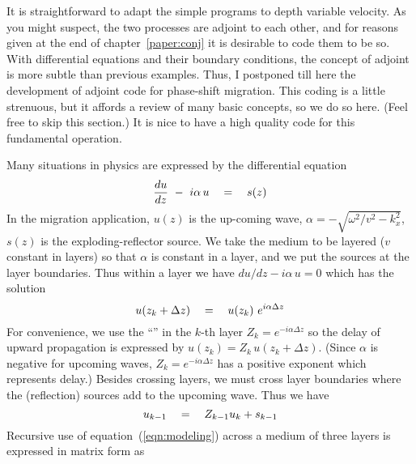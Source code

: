It is straightforward to adapt the simple programs
to depth variable velocity.
As you might suspect, the two processes are adjoint to each other,
and for reasons given at the end of chapter~\ref{paper:conj}
it is desirable to code them to be so.
With differential equations and their boundary conditions,
the concept of adjoint is more subtle than previous examples.
Thus, I postponed till here the development of adjoint code
for phase-shift migration.
This coding is a little strenuous,
but it affords a review of many basic concepts,
so we do so here. (Feel free to skip this section.)
It is nice to have a high quality code for this fundamental operation.

\par
Many situations in physics are expressed by the differential equation
\begin{equation}
{du \over dz} \ - \  i \alpha \, u \quad =\quad s(z)
\end{equation}
In the migration application,
$u(z)$ is the up-coming wave,
$\alpha=-\sqrt{\omega^2 /v^2 - k_x^2}$,
$s(z)$ is the exploding-reflector source.
We take the medium to be layered
($v$ constant in layers)
so that $\alpha$ is constant in a layer,
and we put the sources at the layer boundaries.
Thus within a layer we have $du / dz - i \alpha \, u = 0$
which has the solution 
\begin{equation}
u(z_k+\Delta z ) \quad =\quad u(z_k)\  e^{i \alpha \Delta z}
\end{equation}
For convenience, we use the ``''
in the $k$-th layer
$Z_k= e^{-i \alpha \Delta z}$
so the delay of upward propagation is expressed by
$ u(z_k) = Z_k \, u(z_k+\Delta z )$.
(Since $\alpha$ is negative for upcoming waves,
$Z_k= e^{-i \alpha \Delta z}$
has a positive exponent which represents delay.)
Besides crossing layers, we must cross layer boundaries
where the (reflection) sources add to the upcoming wave.
Thus we have
\begin{equation}
u_{k-1} \quad =\quad Z_{k-1} u_k + s_{k-1}
\label{eqn:modeling}
\end{equation}
Recursive use of equation~(\ref{eqn:modeling}) across a medium
of three layers is expressed in matrix form as
